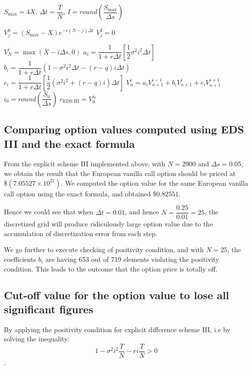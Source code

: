 \begin{algorithm}[H]
	$S_{\max} = 4X$, 
	$\Delta t = \dfrac{T}{N}$, 
	$I = round \left ( \dfrac{S_{\max}}{\Delta s} \right)$\;
	
	 {
		$V^{0}_{j} = (S_{\max} - X)e^{-r(N-j) \Delta t}$\;
		$V^{I}_{j} = 0$\;
	}
	
	 {
		$V^{i}_{N} = \max(X - i\Delta s, 0)$\;
		$a_i = \dfrac{1}{1 + r \Delta t} \left [\dfrac{1}{2} \sigma^2 i^2 \Delta t \right ]$\;
		$b_i = \dfrac{1}{1 + r \Delta t} \left (1 - \sigma^2 i^2 \Delta t - (r-q) i \Delta t \right )$\;
		$c_i = \dfrac{1}{1 + r \Delta t} \left [ \dfrac{1}{2} ( \sigma^2 i^2 + (r-q)i) \Delta t \right ]$\;
		 {
			$V_n^i = a_i V^{i - 1}_{n+1} + b_i V^i_{n+1} + c_i V^{i+1}_{n+1}$ \;
		}
	}
	$i_0 = round \left (\dfrac{S_0}{\Delta s} \right )$\;
	$c_{\text{EDS III}} = V_0^{i_0}$\;
	
\end{algorithm}

\subsection{Comparing option values computed using EDS III and the exact formula}

From the explicit scheme III implemented above, with $N = 2900$ and $\Delta s = 0.05$, we obtain the result that the European vanilla call option should be priced at $\$(7.05527 \times 10^{21})$. We computed the option value for the same European vanilla call option using the exact formula, and obtained $\$0.82551$. 

Hence we could see that when $\Delta t = 0.01$, and hence $N = \dfrac{0.25}{0.01} = 25$, the discretized grid will produce ridiculously large option value due to the accumulation of discretization error from each step.

We go further to execute checking of positivity condition, and with $N = 25$, the coefficients $b_i$ are having 653 out of 719 elements violating the positivity condition. This leads to the outcome that the option price is totally off.

\subsection{Cut-off value for the option value to lose all significant figures}
By applying the positivity condition for explicit difference scheme III, i.e by solving the inequality: $$1 - \sigma^2 i^2 \dfrac{T}{N} - ri \dfrac{T}{N} > 0$$.


